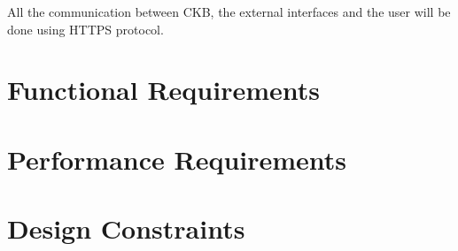 All the communication between CKB, the external interfaces and the user will be done using HTTPS protocol.

\section{Functional Requirements}
\label{s:Functional_requirements}%

\section{Performance Requirements}
\label{s:Performance_requirements}%

\section{Design Constraints}
\label{s:Design_constraints}%

